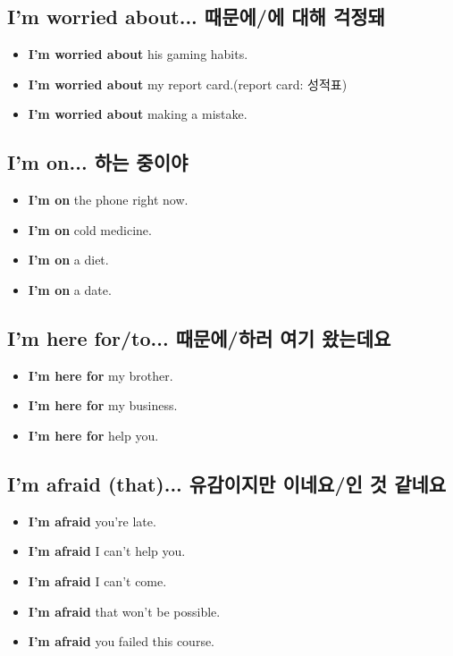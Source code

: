 \documentclass[11pt]{oblivoir}
\begin{document}
\subsection{I'm worried about... \texttildelow 때문에/\texttildelow 에 대해 걱정돼}
\begin{itemize}
  \item \textbf{I'm worried about} his gaming habits.
  \item \textbf{I'm worried about} my report card.(report card: 성적표)
  \item \textbf{I'm worried about} making a mistake.
\end{itemize}

\subsection{I'm on... \texttildelow 하는 중이야}
\begin{itemize}
  \item \textbf{I'm on} the phone right now.
  \item \textbf{I'm on} cold medicine.
  \item \textbf{I'm on} a diet.
  \item \textbf{I'm on} a date.
\end{itemize}

\subsection{I'm here for/to... \texttildelow 때문에/\texttildelow 하러 여기 왔는데요}
\begin{itemize}
  \item \textbf{I'm here for} my brother.
  \item \textbf{I'm here for} my business.
  \item \textbf{I'm here for} help you.
\end{itemize}

\subsection{I'm afraid (that)... 유감이지만 \texttildelow 이네요/\texttildelow 인 것 같네요}

\begin{itemize}
  \item \textbf{I'm afraid} you're late.
  \item \textbf{I'm afraid} I can't help you.
  \item \textbf{I'm afraid} I can't come.
  \item \textbf{I'm afraid} that won't be possible.
  \item \textbf{I'm afraid} you failed this course.
\end{itemize}
\end{document}
